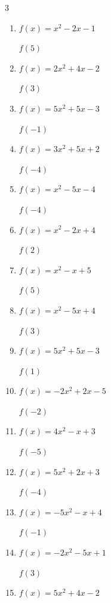 \begin{multicols}{3}
\begin{enumerate}
  \item $f(x)=x^{2}-2x-1$

$f(5)$
        \phantom{$= 14$}

  \item $f(x)=2x^{2}+4x-2$

$f(3)$
        \phantom{$= 28$}

  \item $f(x)=5x^{2}+5x-3$

$f(-1)$
        \phantom{$= -3$}

  \item $f(x)=3x^{2}+5x+2$

$f(-4)$
        \phantom{$= 30$}

  \item $f(x)=x^{2}-5x-4$

$f(-4)$
        \phantom{$= 32$}

  \item $f(x)=x^{2}-2x+4$

$f(2)$
        \phantom{$= 4$}

\columnbreak %

  \item $f(x)=x^{2}-x+5$

$f(5)$
        \phantom{$= 25$}

  \item $f(x)=x^{2}-5x+4$

$f(3)$
        \phantom{$= -2$}

  \item $f(x)=5x^{2}+5x-3$

$f(1)$
        \phantom{$= 7$}

  \item $f(x)=-2x^{2}+2x-5$

$f(-2)$
        \phantom{$= -17$}

  \item $f(x)=4x^{2}-x+3$

$f(-5)$
        \phantom{$= 108$}

  \item $f(x)=5x^{2}+2x+3$

$f(-4)$
        \phantom{$= 75$}

  \item $f(x)=-5x^{2}-x+4$

$f(-1)$
        \phantom{$= 0$}

  \item $f(x)=-2x^{2}-5x+1$

$f(3)$
        \phantom{$= -32$}

  \item $f(x)=5x^{2}+4x-2$


\end{enumerate}
\end{multicols}
